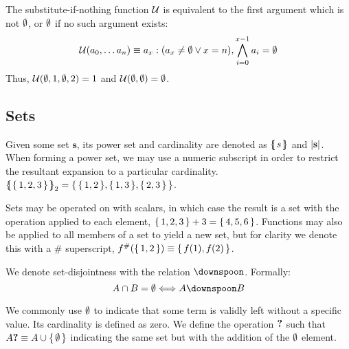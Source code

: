 

The substitute-if-nothing function $\mathcal{U}$ is equivalent to the first argument which is not $\emptyset$, or $\emptyset$ if no such argument exists:
\begin{align}\label{eq:substituteifnothing}
  \subifnone{a_0, \dots a\sub{n}} \equiv a\sub{x} : (a\sub{x} \ne \none \vee x = n), \bigwedge_{i=0}^{x-1} a\sub{i} = \none
\end{align}
Thus, \eg $\subifnone{\none, 1, \none, 2} = 1$ and $\subifnone{\none, \none} = \none$.

\subsection{Sets}\label{sec:sets}

Given some set $\mathbf{s}$, its power set and cardinality are denoted as $\protoset{s}$ and $\len{\mathbf{s}}$. When forming a power set, we may use a numeric subscript in order to restrict the resultant expansion to a particular cardinality. \Eg $\protoset{\set{1, 2, 3}}_2 = \set{ \set{1, 2}, \set{1, 3}, \set{2, 3} }$.

Sets may be operated on with scalars, in which case the result is a set with the operation applied to each element, \eg $\set{1, 2, 3} + 3 = \set{4, 5, 6}$. Functions may also be applied to all members of a set to yield a new set, but for clarity we denote this with a $\#$ superscript, \eg $f^{\#}(\set{1, 2}) \equiv \set{f(1), f(2)}$.

We denote set-disjointness with the relation $\disjoint$. Formally:
\begin{equation*}
  A \cap B = \none \Longleftrightarrow A \disjoint B
\end{equation*}

We commonly use $\emptyset$ to indicate that some term is validly left without a specific value. Its cardinality is defined as zero. We define the operation $\bm{?}$ such that $\optional{A} \equiv A \cup \set{\none}$ indicating the same set but with the addition of the $\emptyset$ element.

